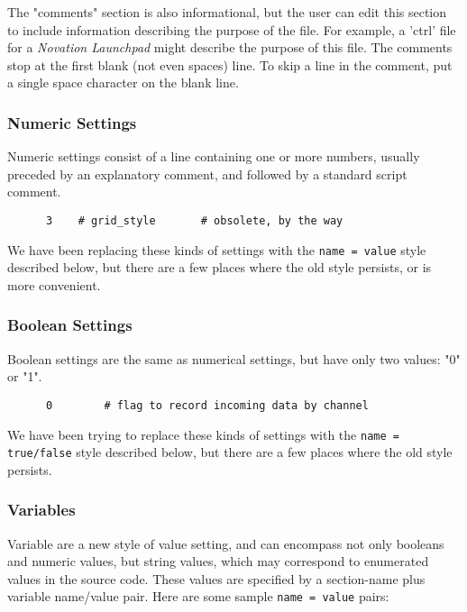    The "comments" section is also informational, but the user can edit this
   section to include information describing the purpose of the file.  For
   example, a 'ctrl' file for a \textsl{Novation Launchpad} might describe the
   purpose of this file.  The comments stop at the first blank (not even spaces)
   line.  To skip a line in the comment, put a single space character on the
   blank line.

\subsubsection{Numeric Settings}
\label{subsec:configuration_common_numeric_settings}

   Numeric settings consist of a line containing one or more numbers, usually
   preceded by an explanatory comment, and followed by a standard script
   comment.

   \begin{verbatim}
      3    # grid_style       # obsolete, by the way
   \end{verbatim}

   We have been replacing these kinds of settings with the
   \texttt{name = value} style described below, but there are a few places
   where the old style persists, or is more convenient.

\subsubsection{Boolean Settings}
\label{subsec:configuration_common_boolean_settings}

   Boolean settings are the same as numerical settings, but have only
   two values: "0" or "1".

   \begin{verbatim}
      0        # flag to record incoming data by channel
   \end{verbatim}

   We have been trying to replace these kinds of settings with the
   \texttt{name = true/false} style described below, but there are a few places
   where the old style persists.

\subsubsection{Variables}
\label{subsec:configuration_common_variables}

   Variable are a new style of value setting, and can encompass not only
   booleans and numeric values, but string values, which may correspond to
   enumerated values in the source code.  These values are specified by a
   section-name plus variable name/value pair.  Here are some sample
   \texttt{name = value} pairs:

